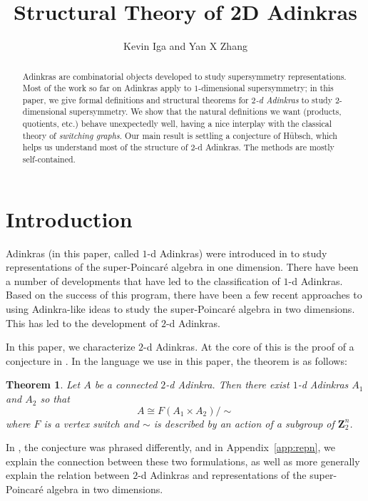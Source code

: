 \documentclass[12pt,twoside,singlespace]{article}
\title{Structural Theory of 2D Adinkras}
\author{Kevin Iga and Yan X Zhang}
\numberwithin{equation}{section}
\newtheorem{thm}[equation]{Theorem}
\theoremstyle{definition}
\newcommand{\ZZ}{\mathbf{Z}}
\begin{document}
\pagestyle{plain}

\maketitle

\begin{abstract}
Adinkras are combinatorial objects developed to study supersymmetry representations. Most of the work so far on Adinkras apply to $1$-dimensional supersymmetry; in this paper, we give formal definitions and structural theorems for \emph{$2$-d Adinkras} to study $2$-dimensional supersymmetry. We show that the natural definitions we want (products, quotients, etc.) behave unexpectedly well, having a nice interplay with the classical theory of \emph{switching graphs}. Our main result is settling a conjecture of H\"ubsch, which helps us understand most of the structure of $2$-d Adinkras. The methods are mostly self-contained.
\end{abstract}


\section{Introduction}
Adinkras (in this paper, called $1$-d Adinkras) were introduced in \cite{d2l:first} to study representations of the super-Poincar\'e algebra in one dimension.  There have been a number of developments that have led to the classification of $1$-d Adinkras.\cite{d2l:graph-theoretic,d2l:omni,d2l:topology,zhang:adinkras,dil:cohomology,d2l:decodes}  Based on the success of this program, there have been a few recent approaches to using Adinkra-like ideas to study the super-Poincar\'e algebra in two dimensions.  This has led to the development of $2$-d Adinkras.\cite{gates:dimensional_extension,hubsch:weaving}

In this paper, we characterize $2$-d Adinkras.  At the core of this is the proof of a conjecture in \cite{hubsch:weaving}.  In the language we use in this paper, the theorem is as follows:

\begin{thm}
\label{thm:main}
Let $A$ be a connected $2$-d Adinkra.  Then there exist $1$-d Adinkras $A_1$ and $A_2$ so that
\[A\cong F(A_1\times A_2)/\sim\]
where $F$ is a vertex switch and  $\sim$ is described by an action of a subgroup of $\ZZ_2^n$.
\end{thm}

In \cite{hubsch:weaving}, the conjecture was phrased differently, and in Appendix~\ref{app:repn}, we explain the connection between these two formulations, as well as more generally explain the relation between $2$-d Adinkras and representations of the super-Poincar\'e algebra in two dimensions.
\end{document}
